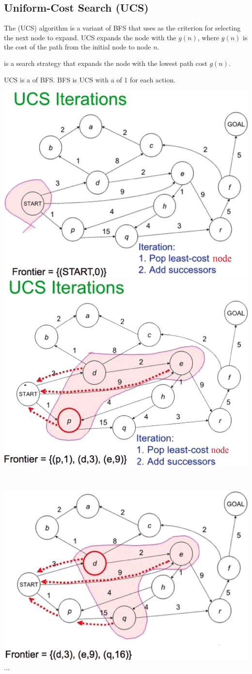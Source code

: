 \subsection{Uniform-Cost Search (UCS)}

The  (UCS) algorithm is a variant of BFS that uses  as the criterion for selecting the next node to expand. UCS expands the node with the  $g(n)$, where $g(n)$ is the cost of the path from the initial node to node $n$.

\begin{definition}\label{def:ucs}
     is a search strategy that expands the node with the lowest path cost $g(n)$.
\end{definition}

\begin{remark}
    UCS is a  of BFS. BFS is UCS with a  of 1 for each action.
\end{remark}

\begin{center}
    \includegraphics[width=0.45\linewidth]{figures/ucs-1.png}
    \hfill
    \includegraphics[width=0.45\linewidth]{figures/ucs-2.png}

    {~~~}

    \includegraphics[width=0.45\linewidth]{figures/ucs-3.png}
    \hfill
    $\dots$
\end{center}

